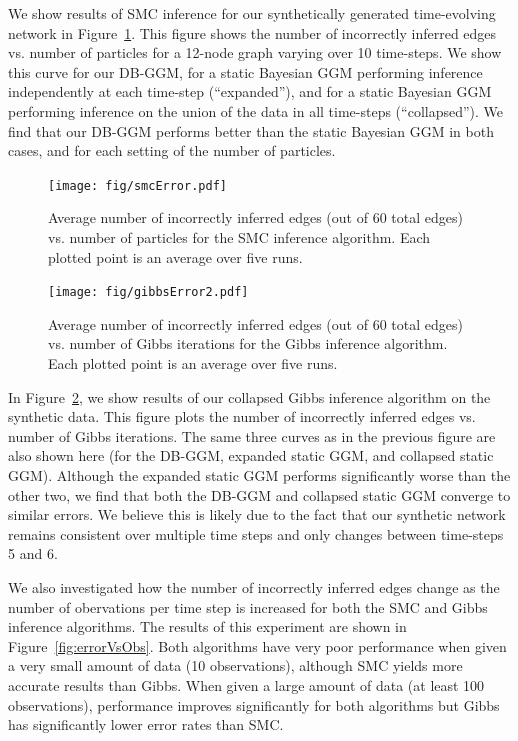 \documentclass{article}
\begin{document}
We show results of SMC inference for our synthetically generated time-evolving network in Figure~\ref{fig:errorVsParticles}. This figure shows the number of incorrectly inferred edges vs. number of particles for a 12-node graph varying over 10 time-steps. We show this curve for our DB-GGM, for a static Bayesian GGM performing inference independently at each time-step (``expanded''), and for a static Bayesian GGM performing inference on the union of the data in all time-steps (``collapsed''). We find that our DB-GGM performs better than the static Bayesian GGM in both cases, and for each setting of the number of particles.

\begin{figure}[h!tbp]
  \centering               
  \texttt{[image: fig/smcError.pdf]}
  \caption{Average number of incorrectly inferred edges (out of 60 total edges) vs. number of particles for the SMC inference algorithm. Each plotted point is an average over five runs.}
  \label{fig:errorVsParticles}
\end{figure}

\begin{figure}[h!tbp]
  \centering               
  \texttt{[image: fig/gibbsError2.pdf]}
  \caption{Average number of incorrectly inferred edges (out of 60 total edges) vs. number of Gibbs iterations for the Gibbs inference algorithm. Each plotted point is an average over five runs.}
  \label{fig:errorVsSamples}
\end{figure}

In Figure~\ref{fig:errorVsSamples}, we show results of our collapsed Gibbs inference algorithm on the synthetic data. This figure plots the number of incorrectly inferred edges vs. number of Gibbs iterations. The same three curves as in the previous figure are also shown here (for the DB-GGM, expanded static GGM, and collapsed static GGM). Although the expanded static GGM performs significantly worse than the other two, we find that both the DB-GGM and collapsed static GGM converge to similar errors. We believe this is likely due to the fact that our synthetic network remains consistent over multiple time steps and only changes between time-steps 5 and 6.

We also investigated how the number of incorrectly inferred edges change as the number of obervations per time step is increased for both the SMC and Gibbs inference algorithms. The results of this experiment are shown in Figure~\ref{fig:errorVsObs}. Both algorithms have very poor performance when given a very small amount of data (10 observations), although SMC yields more accurate results than Gibbs. When given a large amount of data (at least 100 observations), performance improves significantly for both algorithms but Gibbs has significantly lower error rates than SMC. 
\end{document}
